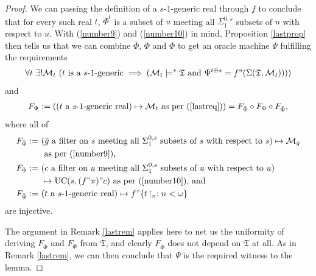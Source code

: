 \documentclass[12pt, twoside]{memoir}
\numberwithin{equation}{section}
\theoremstyle{definition}
\theoremstyle{remark}
\theoremstyle{definition}
\theoremstyle{definition}
\theoremstyle{definition}
\theoremstyle{remark}
\begin{document}
\begin{proof}
We can passing the definition of a $s$-$1$-generic real through $f$ to conclude that for every such real $t$, $\ddot{\Phi}^t$ is a subset of $u$ meeting all $\Sigma^{0, s}_1$ subsets of $u$ with respect to $u$. With (\ref{number9}) and (\ref{number10}) in mind, Proposition \ref{lastprop} then tells us that we can combine $\bar{\Phi}$, $\ddot{\Phi}$ and $\Phi$ to get an oracle machine $\Psi$ fulfilling the requirements 
\begin{align}\label{lastreq}
    \forall t \ \exists ! \mathcal{M}_t \ (t \text{ is a } s \text{-} 1 \text{-generic} \implies (\mathcal{M}_t \models^* \mathfrak{T} \text{ and } \Psi^{t \oplus s} = f" (\Sigma(\mathfrak{T}, \mathcal{M}_t))))
\end{align}
and 
\begin{align*}
    F_{\Psi} := ((t \text{ a } s \text{-} 1 \text{-generic real}) \mapsto \mathcal{M}_t \text{ as per (\ref{lastreq})}) = F_{\bar{\Phi}} \circ F_{\Phi} \circ F_{\ddot{\Phi}} \text{,}
\end{align*}
where all of 
\begin{align*}
    F_{\bar{\Phi}} := \ & (\bar{g} \text{ a filter on } s \text{ meeting all } \Sigma^{0, s}_1 \text{ subsets of } s \text{ with respect to } s) \mapsto \mathcal{M}_{\bar{g}} \\
    & \text{ as per (\ref{number9}),} \\ 
    F_{\Phi} := \ & (c \text{ a filter on } u \text{ meeting all } \Sigma^{0, s}_1 \text{ subsets of } u \text{ with respect to } u) \\ 
    & \mapsto \mathrm{UC}(s, (f" \pi)" c) \text{ as per (\ref{number10}), and} \\
    F_{\ddot{\Phi}} := \ & (t \text{ a } s \text{-} 1 \text{-generic real}) \mapsto f" \{t \! \restriction_n : n < \omega\} 
\end{align*}
are injective.

The argument in Remark \ref{lastrem} applies here to net us the uniformity of deriving $F_{\bar{\Phi}}$ and $F_{\Phi}$ from $\mathfrak{T}$, and clearly $F_{\ddot{\Phi}}$ does not depend on $\mathfrak{T}$ at all. As in Remark \ref{lastrem}, we can then conclude that $\Psi$ is the required witness to the lemma.
\end{proof}
\end{document}
